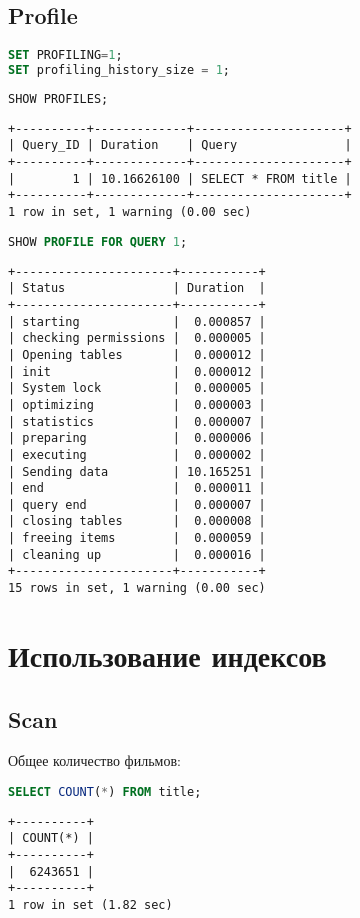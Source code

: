 \documentclass[12pt,a4paper]{article}
\begin{document}
\subsection{Profile}
\begin{lstlisting}[language=SQL]
SET PROFILING=1;
SET profiling_history_size = 1;
\end{lstlisting}

\begin{lstlisting}[language=SQL]
SHOW PROFILES;
\end{lstlisting}
\begin{lstlisting}[basicstyle = \tiny\ttfamily, columns = fixed]
+----------+-------------+---------------------+
| Query_ID | Duration    | Query               |
+----------+-------------+---------------------+
|        1 | 10.16626100 | SELECT * FROM title |
+----------+-------------+---------------------+
1 row in set, 1 warning (0.00 sec)
\end{lstlisting}

\begin{lstlisting}[language=SQL]
SHOW PROFILE FOR QUERY 1;
\end{lstlisting}
\begin{lstlisting}[basicstyle = \tiny\ttfamily, columns = fixed]
+----------------------+-----------+
| Status               | Duration  |
+----------------------+-----------+
| starting             |  0.000857 |
| checking permissions |  0.000005 |
| Opening tables       |  0.000012 |
| init                 |  0.000012 |
| System lock          |  0.000005 |
| optimizing           |  0.000003 |
| statistics           |  0.000007 |
| preparing            |  0.000006 |
| executing            |  0.000002 |
| Sending data         | 10.165251 |
| end                  |  0.000011 |
| query end            |  0.000007 |
| closing tables       |  0.000008 |
| freeing items        |  0.000059 |
| cleaning up          |  0.000016 |
+----------------------+-----------+
15 rows in set, 1 warning (0.00 sec)
\end{lstlisting}

\section{Использование индексов}
\subsection{Scan}
Общее количество фильмов:
\begin{lstlisting}[language=SQL]
SELECT COUNT(*) FROM title;
\end{lstlisting}
\begin{lstlisting}[basicstyle = \tiny\ttfamily, columns = fixed]
+----------+
| COUNT(*) |
+----------+
|  6243651 |
+----------+
1 row in set (1.82 sec)
\end{lstlisting}
\end{document}
